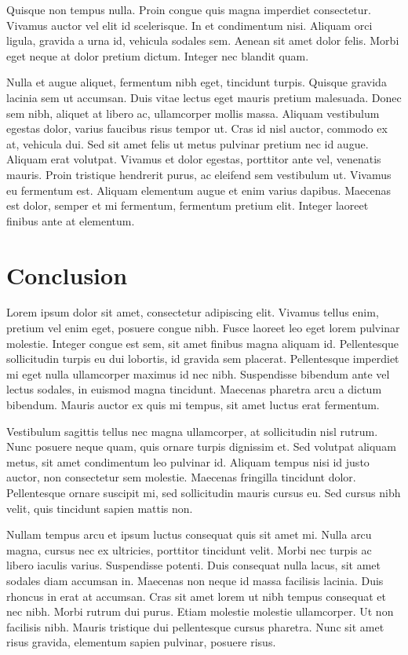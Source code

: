 \documentclass{report}
\begin{document}
Quisque non tempus nulla. Proin congue quis magna imperdiet consectetur. Vivamus auctor vel elit id scelerisque. In et condimentum nisi. Aliquam orci ligula, gravida a urna id, vehicula sodales sem. Aenean sit amet dolor felis. Morbi eget neque at dolor pretium dictum. Integer nec blandit quam.

Nulla et augue aliquet, fermentum nibh eget, tincidunt turpis. Quisque gravida lacinia sem ut accumsan. Duis vitae lectus eget mauris pretium malesuada. Donec sem nibh, aliquet at libero ac, ullamcorper mollis massa. Aliquam vestibulum egestas dolor, varius faucibus risus tempor ut. Cras id nisl auctor, commodo ex at, vehicula dui. Sed sit amet felis ut metus pulvinar pretium nec id augue. Aliquam erat volutpat. Vivamus et dolor egestas, porttitor ante vel, venenatis mauris. Proin tristique hendrerit purus, ac eleifend sem vestibulum ut. Vivamus eu fermentum est. Aliquam elementum augue et enim varius dapibus. Maecenas est dolor, semper et mi fermentum, fermentum pretium elit. Integer laoreet finibus ante at elementum.

\chapter{Conclusion}

Lorem ipsum dolor sit amet, consectetur adipiscing elit. Vivamus tellus enim, pretium vel enim eget, posuere congue nibh. Fusce laoreet leo eget lorem pulvinar molestie. Integer congue est sem, sit amet finibus magna aliquam id. Pellentesque sollicitudin turpis eu dui lobortis, id gravida sem placerat. Pellentesque imperdiet mi eget nulla ullamcorper maximus id nec nibh. Suspendisse bibendum ante vel lectus sodales, in euismod magna tincidunt. Maecenas pharetra arcu a dictum bibendum. Mauris auctor ex quis mi tempus, sit amet luctus erat fermentum.

Vestibulum sagittis tellus nec magna ullamcorper, at sollicitudin nisl rutrum. Nunc posuere neque quam, quis ornare turpis dignissim et. Sed volutpat aliquam metus, sit amet condimentum leo pulvinar id. Aliquam tempus nisi id justo auctor, non consectetur sem molestie. Maecenas fringilla tincidunt dolor. Pellentesque ornare suscipit mi, sed sollicitudin mauris cursus eu. Sed cursus nibh velit, quis tincidunt sapien mattis non.

Nullam tempus arcu et ipsum luctus consequat quis sit amet mi. Nulla arcu magna, cursus nec ex ultricies, porttitor tincidunt velit. Morbi nec turpis ac libero iaculis varius. Suspendisse potenti. Duis consequat nulla lacus, sit amet sodales diam accumsan in. Maecenas non neque id massa facilisis lacinia. Duis rhoncus in erat at accumsan. Cras sit amet lorem ut nibh tempus consequat et nec nibh. Morbi rutrum dui purus. Etiam molestie molestie ullamcorper. Ut non facilisis nibh. Mauris tristique dui pellentesque cursus pharetra. Nunc sit amet risus gravida, elementum sapien pulvinar, posuere risus.
\end{document}
